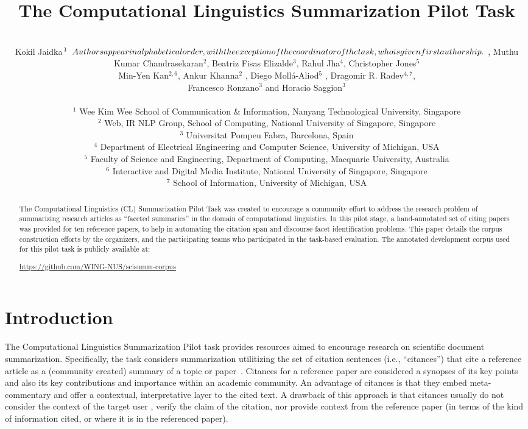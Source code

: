 \documentclass[11pt]{article}
\title{The Computational Linguistics Summarization Pilot Task}
\author{\\Kokil Jaidka$^{1}\relax{\hspace{.2cm}Authors appear in alphabetical order, with the exception of the coordinator of the task, who is given first authorship.} $ , Muthu Kumar Chandrasekaran$^{2}$, Beatriz Fisas Elizalde$^{3}$, Rahul Jha$^{4}$, Christopher Jones$^{5}$ \\ { Min-Yen Kan}$^{2,6}${, Ankur Khanna}$^{2}${ , Diego Moll\'{a}-Aliod}$^{5}${ , Dragomir R. Radev}$^{4,7}$, \\ { Francesco Ronzano}$^{3}$ and { Horacio Saggion}$^{3}$ \\ 
\\
$^1$ Wee Kim Wee School of Communication \& Information, Nanyang Technological University, Singapore \\
$^2$ Web, IR \/ NLP Group, School of Computing, National University of Singapore, Singapore \\
$^3$ Universitat Pompeu Fabra, Barcelona, Spain\\
$^4$ Department of Electrical Engineering and Computer Science, University of Michigan, USA\\
$^5$ Faculty of Science and Engineering, Department of Computing, Macquarie University, Australia\\
$^6$ Interactive and Digital Media Institute, National University of Singapore, Singapore\\
$^7$ School of Information, University of Michigan, USA}
\begin{document}
\maketitle
\begin{abstract}
The Computational Linguistics (CL) Summarization Pilot Task was created to encourage a community effort 
to address the research problem of summarizing research articles as ``faceted summaries'' in the domain 
of computational linguistics. In this pilot stage, a hand-annotated set of citing papers was provided for 
ten reference papers, to help in automating the citation span and discourse facet identification problems.  
This paper details the corpus construction efforts by the organizers, and the participating teams who participated in the task-based evaluation. The annotated development corpus used for this pilot task is 
publicly available at:
\begin{sloppypar}
\url{https://github.com/WING-NUS/scisumm-corpus}
\end{sloppypar}
\end{abstract}
\section{Introduction}

The Computational Linguistics Summarization Pilot task provides
resources aimed to encourage research on
scientific document summarization.  Specifically, the task considers
summarization utilitizing the set of citation sentences (i.e.,
``citances'') that cite a reference article as a (community created)
summary of a topic or
paper~\cite{nanba2011classification,qazvinian2010identifying}. Citances
for a reference paper are considered a synopses of its key points and
also its key contributions and importance within an academic
community. An advantage of citances is that they embed meta-commentary
and offer a contextual, interpretative layer to the cited text. A
drawback of this approach is that citances usually do not consider the
context of the target user
\cite{jones2007automatic,teufel2002summarizing}, verify the claim of
the citation, nor provide context from the reference paper (in terms of
the kind of information cited, or where it is in the referenced
paper).
\end{document}
